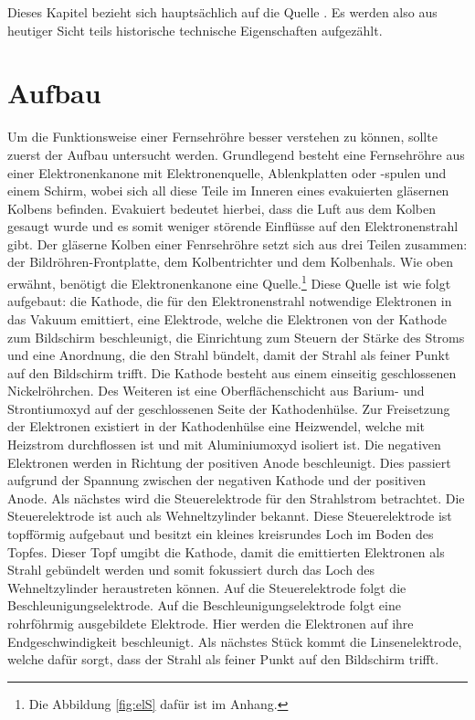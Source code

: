 Dieses Kapitel bezieht sich hauptsächlich auf die Quelle \cite{Fernsehroehre}.
Es werden also aus heutiger Sicht teils historische technische Eigenschaften aufgezählt.
\section{Aufbau}
\label{sec:aufbau}
Um die Funktionsweise einer Fernsehröhre besser verstehen zu können, sollte zuerst der Aufbau untersucht werden.
Grundlegend besteht eine Fernsehröhre aus einer Elektronenkanone mit Elektronenquelle, Ablenkplatten oder -spulen und einem Schirm, wobei sich all diese Teile im Inneren eines evakuierten gläsernen Kolbens befinden.
Evakuiert bedeutet hierbei, dass die Luft aus dem Kolben gesaugt wurde und es somit weniger störende Einflüsse auf den Elektronenstrahl gibt.
Der gläserne Kolben einer Fenrsehröhre setzt sich aus drei Teilen zusammen: der Bildröhren-Frontplatte, dem Kolbentrichter und dem Kolbenhals.
Wie oben erwähnt, benötigt die Elektronenkanone eine Quelle.\footnote{Die Abbildung \ref{fig:elS} dafür ist im Anhang.}
Diese Quelle ist wie folgt aufgebaut: die Kathode, die für den Elektronenstrahl notwendige Elektronen in das Vakuum emittiert, eine Elektrode, welche die Elektronen von der Kathode zum Bildschirm beschleunigt, die Einrichtung zum Steuern der Stärke des Stroms und eine Anordnung, die den Strahl bündelt, damit der Strahl als feiner Punkt auf den Bildschirm trifft. 
Die Kathode besteht aus einem einseitig geschlossenen Nickelröhrchen.
Des Weiteren ist eine Oberflächenschicht aus Barium- und Strontiumoxyd auf der geschlossenen Seite der Kathodenhülse.
Zur Freisetzung der Elektronen existiert in der Kathodenhülse eine Heizwendel, welche mit Heizstrom durchflossen ist und mit Aluminiumoxyd isoliert ist.
Die negativen Elektronen werden in Richtung der positiven Anode beschleunigt.
Dies passiert aufgrund der Spannung zwischen der negativen Kathode und der positiven Anode.
Als nächstes wird die Steuerelektrode für den Strahlstrom betrachtet.
Die Steuerelektrode ist auch als Wehneltzylinder bekannt.
Diese Steuerelektrode ist topfförmig aufgebaut und besitzt ein kleines kreisrundes Loch im Boden des Topfes.
Dieser Topf umgibt die Kathode, damit die emittierten Elektronen als Strahl gebündelt werden und somit fokussiert durch das Loch des Wehneltzylinder heraustreten können.
Auf die Steuerelektrode folgt die Beschleunigungselektrode.
Auf die Beschleunigungselektrode folgt eine rohrföhrmig ausgebildete Elektrode.
Hier werden die Elektronen auf ihre Endgeschwindigkeit beschleunigt.
Als nächstes Stück kommt die Linsenelektrode, welche dafür sorgt, dass der Strahl als feiner Punkt auf den Bildschirm trifft.
